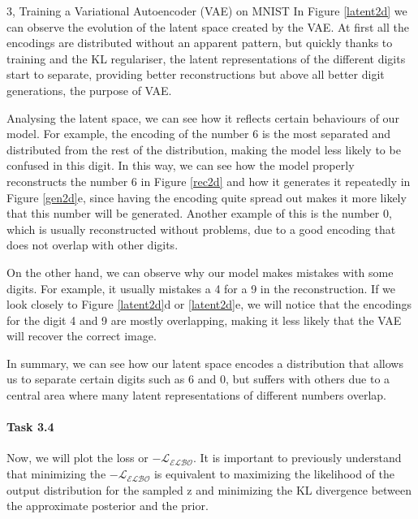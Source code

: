 \begin{task}{3, Training a Variational Autoencoder (VAE) on MNIST}
In Figure \ref{latent2d} we can observe the evolution of the latent space created by the VAE. At first all the encodings are distributed without an apparent pattern, but quickly thanks to training and the KL regulariser, the latent representations of the different digits start to separate, providing better reconstructions but above all better digit generations, the purpose of VAE. 

Analysing the latent space, we can see how it reflects certain behaviours of our model. For example, the encoding of the number 6 is the most separated and distributed from the rest of the distribution, making the model less likely to be confused in this digit. In this way, we can see how the model properly reconstructs the number 6 in Figure \ref{rec2d} and how it generates it repeatedly in Figure  \ref{gen2d}e, since having the encoding quite spread out makes it more likely that this number will be generated. Another example of this is the number 0, which is usually reconstructed without problems, due to a good encoding that does not overlap with other digits.

On the other hand, we can observe why our model makes mistakes with some digits. For example, it usually mistakes a 4 for a 9 in the reconstruction. If we look closely to Figure \ref{latent2d}d or \ref{latent2d}e, we will notice that the encodings for the digit 4 and 9 are mostly overlapping, making it less likely that the VAE will recover the correct image. 

In summary, we can see how our latent space encodes a distribution that allows us to separate certain digits such as 6 and 0, but suffers with others due to a central area where many latent representations of different numbers overlap.

\paragraph{Task 3.4} Now, we will plot the loss or \(-\mathcal{L_{ELBO}}\). It is important to previously understand that minimizing the \(-\mathcal{L_{ELBO}}\) is equivalent to maximizing the likelihood of the output distribution for the sampled z and minimizing the KL divergence between the approximate posterior and the prior.


\end{task}
